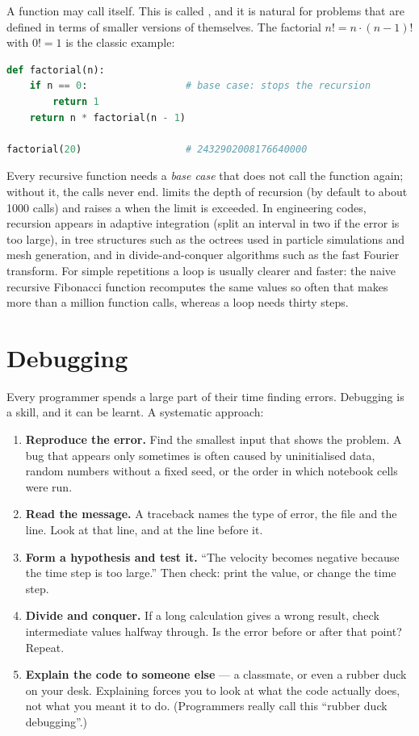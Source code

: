 A function may call itself. This is called , and it is natural for
problems that are defined in terms of smaller versions of themselves. The factorial
$n! = n \cdot (n-1)!$ with $0! = 1$ is the classic example:
\begin{lstlisting}[language=Python]
def factorial(n):
    if n == 0:                 # base case: stops the recursion
        return 1
    return n * factorial(n - 1)

factorial(20)                  # 2432902008176640000
\end{lstlisting}
Every recursive function needs a \emph{base case} that does not call the function again;
without it, the calls never end. \py limits the depth of recursion (by default to about
1000 calls) and raises a  when the limit is exceeded. In engineering
codes, recursion appears in adaptive integration (split an interval in two if the error is
too large), in tree structures such as the octrees used in particle simulations and mesh
generation, and in divide-and-conquer algorithms such as the fast Fourier transform. For
simple repetitions a loop is usually clearer and faster: the naive recursive Fibonacci
function  recomputes the same values so often that
 makes more than a million function calls, whereas a loop needs thirty steps.

\section{Debugging}

Every programmer spends a large part of their time finding errors. Debugging is a skill,
and it can be learnt. A systematic approach:
\begin{enumerate}
\item \textbf{Reproduce the error.} Find the smallest input that shows the problem. A bug
  that appears only sometimes is often caused by uninitialised data, random numbers without
  a fixed seed, or the order in which notebook cells were run.
\item \textbf{Read the message.} A traceback names the type of error, the file and the line.
  Look at that line, and at the line before it.
\item \textbf{Form a hypothesis and test it.} ``The velocity becomes negative because the
  time step is too large.'' Then check: print the value, or change the time step.
\item \textbf{Divide and conquer.} If a long calculation gives a wrong result, check
  intermediate values halfway through. Is the error before or after that point? Repeat.
\item \textbf{Explain the code to someone else} --- a classmate, or even a rubber duck on
  your desk. Explaining forces you to look at what the code actually does, not what you
  meant it to do. (Programmers really call this ``rubber duck debugging''.)
\end{enumerate}


